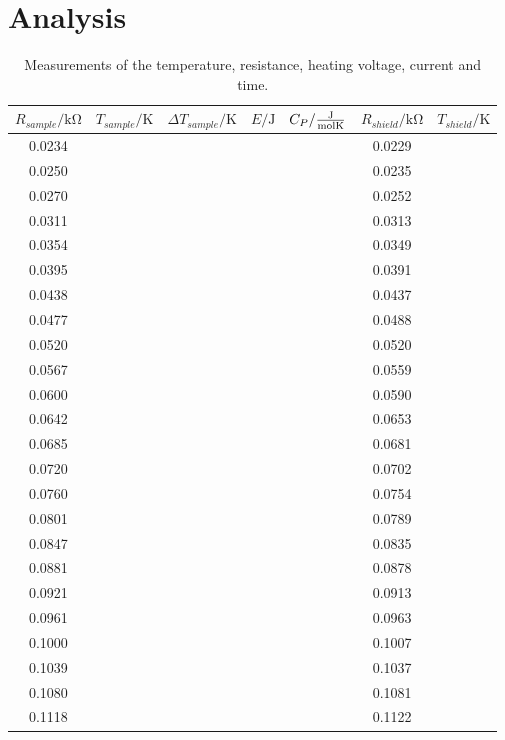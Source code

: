 \chapter{Analysis}
\label{cha:analysis}

\begin{table}[htbp] 
    \centering 
    \begin{tabular}{ccccc | c c} 
        \toprule  $R_{sample}/\unit{\kilo\ohm}$ & $T_{sample} / \unit{\kelvin}$ & $\Delta T_{sample} / \unit{\kelvin}$ & $E/\unit{\joule}$ & $C_P / \unit{\frac{\joule}{\mol\kelvin}} $ & $R_{shield}/\unit{\kilo\ohm}$ & $T_{shield} / \unit{\kelvin}$\\ 
        \midrule 
        0.0234 & & & &  & 0.0229&  \\   
        0.0250 & & & &  & 0.0235&  \\
        0.0270 & & & &  & 0.0252&  \\
        0.0311 & & & &  & 0.0313&  \\
        0.0354 & & & &  & 0.0349&  \\
        0.0395 & & & &  & 0.0391&  \\
        0.0438 & & & &  & 0.0437&  \\
        0.0477 & & & &  & 0.0488&  \\
        0.0520 & & & &  & 0.0520&  \\
        0.0567 & & & &  & 0.0559&  \\
        0.0600 & & & &  & 0.0590&  \\
        0.0642 & & & &  & 0.0653&  \\
        0.0685 & & & &  & 0.0681&  \\
        0.0720 & & & &  & 0.0702&  \\
        0.0760 & & & &  & 0.0754&  \\
        0.0801 & & & &  & 0.0789&  \\
        0.0847 & & & &  & 0.0835&  \\
        0.0881 & & & &  & 0.0878&  \\
        0.0921 & & & &  & 0.0913&  \\
        0.0961 & & & &  & 0.0963&  \\
        0.1000 & & & &  & 0.1007&  \\
        0.1039 & & & &  & 0.1037&  \\
        0.1080 & & & &  & 0.1081&  \\
        0.1118 & & & &  & 0.1122&  \\
        \bottomrule 
    \end{tabular} 
    \caption[Tabelle]{Measurements of the temperature, resistance, heating voltage, current and time.} 
    \label{tab:measurement} 
\end{table}

